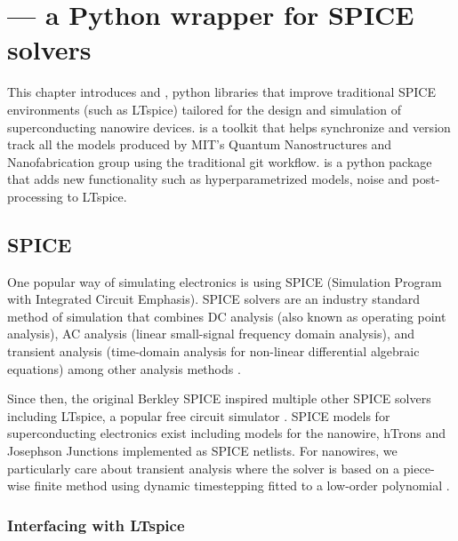 \begin{sloppypar}
\section{ ---\hspace{20px} a Python wrapper for SPICE solvers}
\end{sloppypar}

This chapter introduces  and , python libraries that improve
traditional SPICE environments (such as LTspice) tailored for the design and simulation of
superconducting nanowire devices.  is a toolkit that helps synchronize and
version track all the models produced by MIT's Quantum Nanostructures and Nanofabrication 
group using the traditional git workflow.  is a python package that adds 
new functionality such as hyperparametrized models, noise and post-processing to LTspice.

\subsection{SPICE}

One popular way of simulating electronics is using SPICE 
(Simulation Program with Integrated Circuit Emphasis). 
SPICE solvers are an industry standard method of simulation that combines DC analysis (also known as
operating point analysis), AC analysis (linear small-signal frequency domain analysis), and 
transient analysis (time-domain analysis for non-linear differential algebraic equations)
among other analysis methods \cite{spice-og}.

Since then, the original Berkley SPICE
inspired multiple other SPICE solvers including LTspice, a popular free circuit simulator \cite{ltspice-diff-post}. SPICE models for 
superconducting electronics exist including models for the nanowire,
hTrons and Josephson Junctions implemented as SPICE netlists. For nanowires, we
particularly care about transient analysis where the solver
is based on a piece-wise finite method using dynamic timestepping fitted to a 
low-order polynomial \cite{spice-book}.

\subsubsection{Interfacing with LTspice}%
\label{interfacing_with_ltspice}

